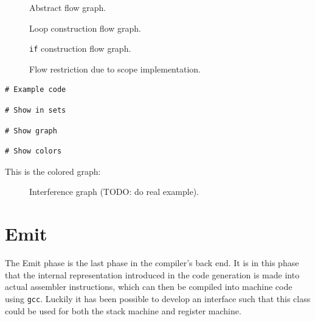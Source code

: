 \begin{figure}[H]
    \centering
    
    \caption{Abstract flow graph.}
\end{figure}

\begin{figure}[H]
    \centering
    
    \caption{Loop construction flow graph.}
\end{figure}

\begin{figure}[H]
    \centering
    
    \caption{\texttt{if} construction flow graph.}
\end{figure}

\begin{figure}[H]
    \centering
    
    \caption{Flow restriction due to scope implementation.}
\end{figure}

\begin{verbatim}
# Example code
\end{verbatim}

\begin{verbatim}
# Show in sets
\end{verbatim}

\begin{verbatim}
# Show graph
\end{verbatim}

\begin{verbatim}
# Show colors
\end{verbatim}

This is the colored graph:
\begin{figure}[H]
    \centering
    
    \caption{Interference graph (TODO: do real example).}
\end{figure}

\newpage

\section{Emit}
The Emit phase is the last phase in the compiler's back end. It is in this phase that the internal representation introduced in the code generation is made into actual assembler instructions, which can then be compiled into machine code using \texttt{gcc}. Luckily it has been possible to develop an interface such that this class could be used for both the stack machine and register machine.

